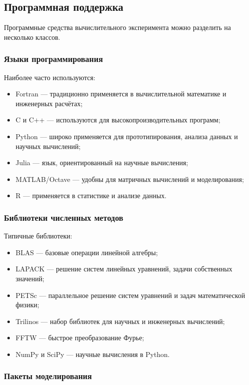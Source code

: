 \documentclass[12pt,a4paper]{article}
\theoremstyle{definition}
\theoremstyle{plain}
\begin{document}
\subsection{Программная поддержка}

Программные средства вычислительного эксперимента можно разделить на несколько классов.

\subsubsection{Языки программирования}

Наиболее часто используются:
\begin{itemize}
    \item Fortran --- традиционно применяется в вычислительной математике и инженерных расчётах;
    \item C и C++ --- используются для высокопроизводительных программ;
    \item Python --- широко применяется для прототипирования, анализа данных и научных вычислений;
    \item Julia --- язык, ориентированный на научные вычисления;
    \item MATLAB/Octave --- удобны для матричных вычислений и моделирования;
    \item R --- применяется в статистике и анализе данных.
\end{itemize}

\subsubsection{Библиотеки численных методов}

Типичные библиотеки:
\begin{itemize}
    \item BLAS --- базовые операции линейной алгебры;
    \item LAPACK --- решение систем линейных уравнений, задачи собственных значений;
    \item PETSc --- параллельное решение систем уравнений и задач математической физики;
    \item Trilinos --- набор библиотек для научных и инженерных вычислений;
    \item FFTW --- быстрое преобразование Фурье;
    \item NumPy и SciPy --- научные вычисления в Python.
\end{itemize}

\subsubsection{Пакеты моделирования}
\end{document}
